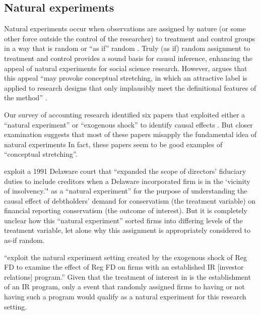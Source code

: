 \documentclass[11pt]{amsart}
\begin{document}

\subsection{Natural experiments}
Natural experiments occur when observations are assigned by nature (or some other force outside the control of the researcher) to treatment and control groups in a way that is random or ``as if'' random \citep{Dunning:2012tt}. 
Truly (as if) random assignment to treatment and control provides a sound basis for causal inference, enhancing the appeal of natural experiments for social science research.
However, argues that this appeal ``may provoke conceptual stretching, in which an attractive label is applied to research designs that only implausibly meet the definitional features of the method'' \citep[p.3]{Dunning:2012tt}.

Our survey of accounting research identified six papers that exploited either a ``natural experiment'' or ``exogenous shock'' to identify causal effects \citep{Lo:2013jk,Aier:2014ii,Kirk:2014gx,Houston:2014hv}. %
But closer examination suggests that most of these papers misapply the fundamental idea of natural experiments  In fact, these papers seem to be good examples of ``conceptual stretching''.

\cite{Aier:2014ii} exploit a 1991 Delaware court that ``expanded the scope of directors' fiduciary duties to include creditors when a Delaware incorporated firm is in the `vicinity of insolvency.'" as a ``natural experiment'' for the purpose of understanding the causal effect of debtholders' demand for conservatism (the treatment variable) on financial reporting conservatism (the outcome of interest). But it is completely unclear how this ``natural experiment'' sorted firms into differing levels of the treatment variable, let alone why this assignment is appropriately considered to as-if random.

\citet{Kirk:2014gx} ``exploit the natural experiment setting created by the exogenous shock of Reg FD to examine the effect of Reg FD on firms with an established IR [investor relations] program.'' 
Given that the treatment of interest in \citet{Kirk:2014gx} is the establishment of an IR program, only a event that randomly assigned firms to having or not having such a program would qualify as a natural experiment for this research setting.
\end{document}
